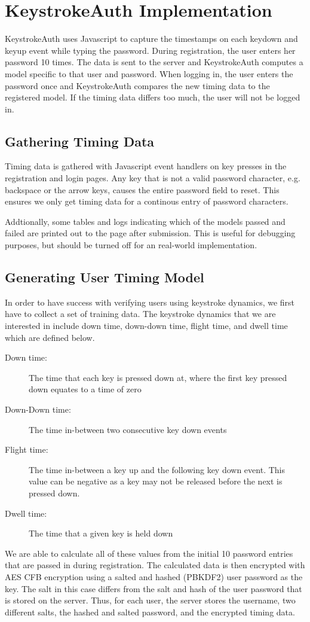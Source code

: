 \documentclass{article}
\begin{document}
\section{KeystrokeAuth Implementation}
KeystrokeAuth uses Javascript to capture the timestamps on each keydown and keyup event while typing the password.
During registration, the user enters her password 10 times.
The data is sent to the server and KeystrokeAuth computes a model specific to that user and password.
When logging in, the user enters the password once and KeystrokeAuth compares the new timing data to the registered model.
If the timing data differs too much, the user will not be logged in.

\subsection{Gathering Timing Data}
Timing data is gathered with Javascript event handlers on key presses in the registration and login pages. Any key that is not a valid password character, e.g. backspace or the arrow keys, causes the entire password field to reset. This ensures we only get timing data for a continous entry of password characters.

Addtionally, some tables and logs indicating which of the models passed and failed are printed out to the page after submission. This is useful for debugging purposes, but should be turned off for an real-world implementation.


\subsection{Generating User Timing Model}
In order to have success with verifying users using keystroke dynamics, we first have to collect a set of training data. The keystroke dynamics that we are interested in include down time, down-down time, flight time, and dwell time which are defined below. 
\begin{description}
	\item[Down time:] The time that each key is pressed down at, where the first key pressed down equates to a time of zero
	\item[Down-Down time:] The time in-between two consecutive key down events
	\item[Flight time:] The time in-between a key up and the following key down event. This value can be negative as a key may not be released before the next is pressed down. 
	\item[Dwell time:] The time that a given key is held down
\end{description}
We are able to calculate all of these values from the initial 10 password entries that are passed in during registration. The calculated data is then encrypted with AES CFB encryption using a salted and hashed (PBKDF2) user password as the key. The salt in this case differs from the salt and hash of the user password that is stored on the server. Thus, for each user, the server stores the username, two different salts, the hashed and salted password, and the encrypted timing data.
\end{document}
